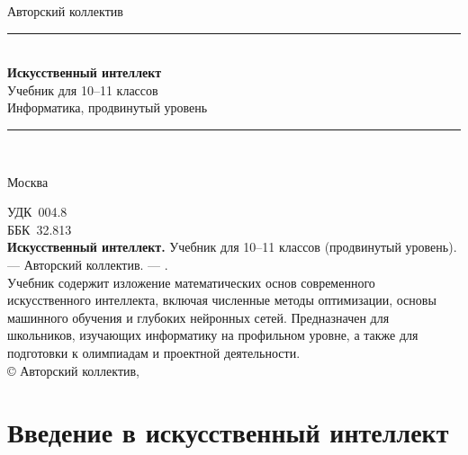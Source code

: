 \documentclass[11pt, openany, twoside]{book}
\begin{document}
\begin{titlepage}
\centering
\vspace*{2cm}
{\sffamily\Large Авторский коллектив}\\[1.4cm]
{\color{accent}\rule{\linewidth}{1.2pt}}\\[0.4cm]
{\sffamily\Huge\bfseries Искусственный интеллект}\\[0.6cm]
{\sffamily\LARGE Учебник для 10--11 классов}\\[0.3cm]
{\sffamily\large Информатика, продвинутый уровень}\\[0.4cm]
{\color{accent}\rule{\linewidth}{1.2pt}}\\[3cm]


\vfill
{\sffamily\large Москва\quad\textbullet\quad\the\year}
\end{titlepage}

\thispagestyle{empty}
\vspace*{\fill}
\noindent\small
УДК~004.8\\
ББК~32.813\\[1em]
\textbf{Искусственный интеллект.} Учебник для 10--11 классов
(продвинутый уровень). --- Авторский коллектив. --- \the\year.\\[1em]
Учебник содержит изложение математических основ современного
искусственного интеллекта, включая численные методы оптимизации,
основы машинного обучения и глубоких нейронных сетей. Предназначен
для школьников, изучающих информатику на профильном уровне, а также
для подготовки к олимпиадам и проектной деятельности.\\[1em]
\copyright{} Авторский коллектив, \the\year
\clearpage

\frontmatter
\tableofcontents


\mainmatter

\part{Введение в искусственный интеллект}

\end{document}
